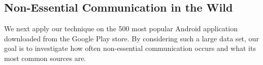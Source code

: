 \subsection{Non-Essential Communication in the Wild}

We next apply our technique on the 500 most popular Android application
downloaded from the Google Play store. By considering such a large data set, our goal is to
investigate how often non-essential communication occurs and what its most common sources are.


